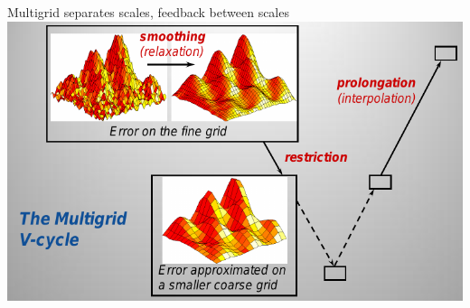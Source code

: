 \documentclass{beamer}
\begin{document}
\begin{frame}{Multigrid separates scales, feedback between scales}
  \includegraphics[width=\textwidth]{figures/YangAMGSummary} \\
\end{frame}


\end{document}
